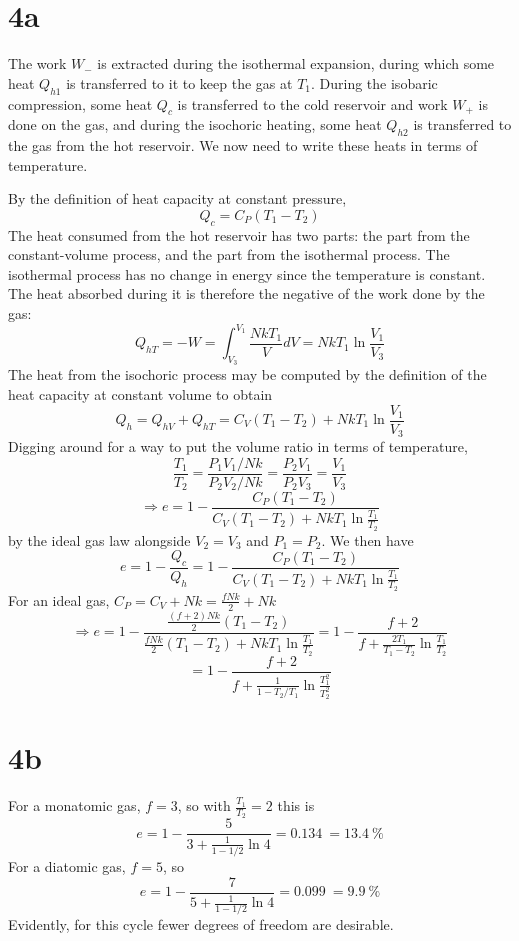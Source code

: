 \documentclass{article}
\begin{document}
\section*{4a}
The work $W_{-}$ is extracted during the isothermal expansion, during which some heat $Q_{h1}$ is transferred to it to keep the gas at $T_{1}$.
During the isobaric compression, some heat $Q_{c}$ is transferred to the cold reservoir and work $W_{+}$ is done on the gas, and during the isochoric heating, some heat $Q_{h2}$ is transferred to the gas from the hot reservoir.
We now need to write these heats in terms of temperature.

By the definition of heat capacity at constant pressure,
\[Q_{c}=C_{P}(T_{1}-T_{2})\]
The heat consumed from the hot reservoir has two parts: the part from the constant-volume process, and the part from the isothermal process. The isothermal process has no change in energy since the temperature is constant. The heat absorbed during it is therefore the negative of the work done by the gas:
\[Q_{hT}=-W=\int_{V_{3}}^{V_{1}}\frac{NkT_{1}}{V}dV=NkT_{1}\ln\frac{V_{1}}{V_{3}}\]
The heat from the isochoric process may be computed by the definition of the heat capacity at constant volume to obtain
\[Q_{h}=Q_{hV}+Q_{hT}=C_{V}(T_{1}-T_{2})+NkT_{1}\ln\frac{V_{1}}{V_{3}}\]
Digging around for a way to put the volume ratio in terms of temperature,
\[\frac{T_{1}}{T_{2}}=\frac{P_{1}V_{1}/Nk}{P_{2}V_{2}/Nk}=\frac{P_{2}V_{1}}{P_{2}V_{3}}=\frac{V_{1}}{V_{3}}\]
\[\Rightarrow e=1-\frac{C_{P}(T_{1}-T_{2})}{C_{V}(T_{1}-T_{2})+NkT_{1}\ln\frac{T_{1}}{T_{2}}}\]
by the ideal gas law alongside $V_{2}=V_{3}$ and $P_{1}=P_{2}$.
We then have
\[e=1-\frac{Q_{c}}{Q_{h}}=1-\frac{C_{P}(T_{1}-T_{2})}{C_{V}(T_{1}-T_{2})+NkT_{1}\ln\frac{T_{1}}{T_{2}}}\]
For an ideal gas, $C_{P}=C_{V}+Nk=\frac{fNk}{2}+Nk$
\[\Rightarrow e=1-\frac{\frac{(f+2)Nk}{2}(T_{1}-T_{2})}{\frac{fNk}{2}(T_{1}-T_{2})+NkT_{1}\ln\frac{T_{1}}{T_{2}}}=1-\frac{f+2}{f+\frac{2T_{1}}{T_{1}-T_{2}}\ln\frac{T_{1}}{T_{2}}}\]
\[=1-\frac{f+2}{f+\frac{1}{1-T_{2}/T_{1}}\ln\frac{T_{1}^{2}}{T_{2}^{2}}}\]

\section*{4b}
For a monatomic gas, $f=3$, so with $\frac{T_{1}}{T_{2}}=2$ this is
\[e=1-\frac{5}{3+\frac{1}{1-1/2}\ln 4}=\SI{0.134}{}=\SI{13.4}{\% }\]
For a diatomic gas, $f=5$, so
\[e=1-\frac{7}{5+\frac{1}{1-1/2}\ln 4}=\SI{0.099}{=\SI{9.9}{\%}}\]
Evidently, for this cycle fewer degrees of freedom are desirable.
\end{document}
